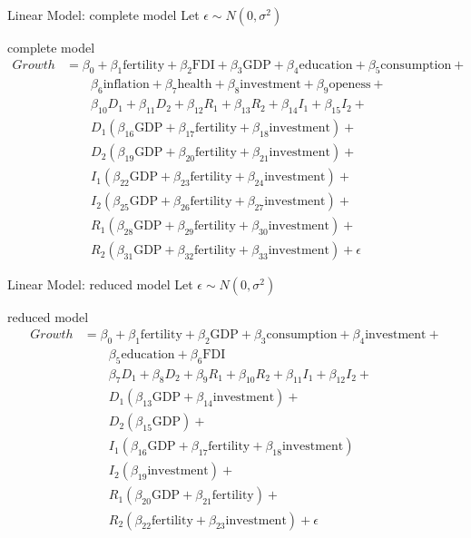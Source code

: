 \documentclass[9pt]{beamer}
\begin{document}
\begin{frame}{Linear Model: complete model}
	Let $ \epsilon \sim N(0,\sigma^2)$
	\begin{block}{complete model}
		\begin{align*}
		Growth &= \beta_0+\beta_1\text{fertility}+\beta_2\text{FDI}+\beta_3\text{GDP}+\beta_4\text{education}+\beta_5\text{consumption}+\\
		&\qquad \beta_6\text{inflation}+\beta_7\text{health}+\beta_8\text{investment}+\beta_9\text{openess}+\\
		& \qquad \beta_{10}D_1+\beta_{11}D_2+\beta_{12}R_1+\beta_{13}R_2+\beta_{14}I_1+\beta_{15}I_2+\\
		&\qquad D_1(\beta_{16}\text{GDP}+\beta_{17}\text{fertility}+\beta_{18}\text{investment})+\\
		&\qquad D_2(\beta_{19}\text{GDP}+\beta_{20}\text{fertility}+\beta_{21}\text{investment})+\\
		&\qquad I_1(\beta_{22}\text{GDP}+\beta_{23}\text{fertility}+\beta_{24}\text{investment})+\\
		&\qquad I_2(\beta_{25}\text{GDP}+\beta_{26}\text{fertility}+\beta_{27}\text{investment})+\\
		&\qquad R_1(\beta_{28}\text{GDP}+\beta_{29}\text{fertility}+\beta_{30}\text{investment})+\\
		&\qquad R_2(\beta_{31}\text{GDP}+\beta_{32}\text{fertility}+\beta_{33}\text{investment}) + \epsilon \end{align*}
	\end{block}
\end{frame}
\begin{frame}{Linear Model: reduced model}
	Let $ \epsilon \sim N(0,\sigma^2)$
    \begin{block}{reduced model}
    	\begin{align*}
    	Growth &= \beta_0+\beta_1\text{fertility}+\beta_2\text{GDP}+\beta_3\text{consumption}+\beta_4\text{investment}+\\
    	&\qquad \beta_{5}\text{education}+\beta_{6}\text{FDI}\\
    	& \qquad \beta_{7}D_1+\beta_{8}D_2+\beta_{9}R_1+\beta_{10}R_2+\beta_{11}I_1+\beta_{12}I_2+\\
    	& \qquad D_1(\beta_{13}\text{GDP}+\beta_{14}\text{investment})+\\
    	& \qquad
    	 D_2(\beta_{15}\text{GDP})+\\
    	& \qquad I_1(\beta_{16}\text{GDP}+\beta_{17}\text{fertility}+\beta_{18}\text{investment})\\
    	& \qquad I_2(\beta_{19}\text{investment}) +\\
    	&\qquad R_1(\beta_{20}\text{GDP}+\beta_{21}\text{fertility})+\\
    	&\qquad
    	R_2(\beta_{22}\text{fertility}+\beta_{23}\text{investment}) + \epsilon \end{align*}
    \end{block}
   
\end{frame}
\end{document}
